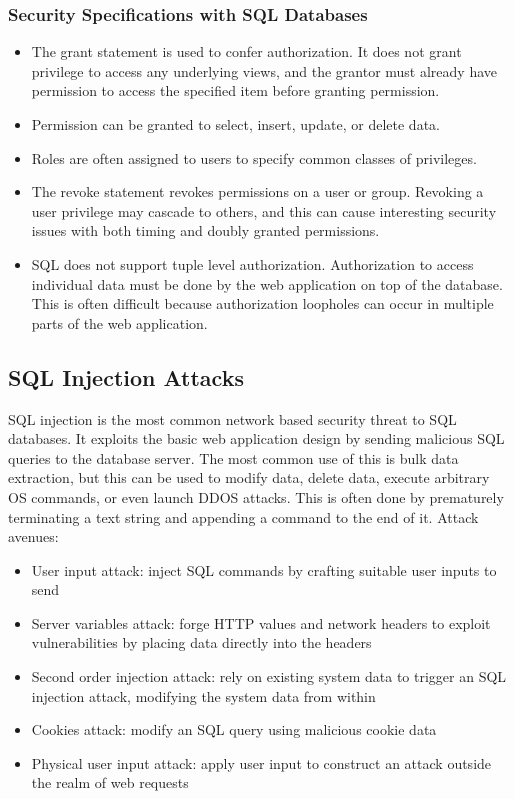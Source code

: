 \documentclass{math}
\begin{document}
\subsubsection*{Security Specifications with SQL Databases}
\begin{itemize}
  \item The grant statement is used to confer authorization. It does not grant
  privilege to access any underlying views, and the grantor must already have
  permission to access the specified item before granting permission.
  \item Permission can be granted to select, insert, update, or delete data.
  \item Roles are often assigned to users to specify common classes of
  privileges.
  \item The revoke statement revokes permissions on a user or group. Revoking
  a user privilege may cascade to others, and this can cause interesting
  security issues with both timing and doubly granted permissions.
  \item SQL does not support tuple level authorization. Authorization to access
  individual data must be done by the web application on top of the database.
  This is often difficult because authorization loopholes can occur in multiple
  parts of the web application.
\end{itemize}

\subsection*{SQL Injection Attacks}
SQL injection is the most common network based security threat to SQL databases.
It exploits the basic web application design by sending malicious SQL queries to
the database server. The most common use of this is bulk data extraction, but
this can be used to modify data, delete data, execute arbitrary OS commands, or
even launch DDOS attacks. This is often done by prematurely terminating a text
string and appending a command to the end of it. Attack avenues:
\begin{itemize}
  \item User input attack: inject SQL commands by crafting suitable user inputs
  to send
  \item Server variables attack: forge HTTP values and network headers to
  exploit vulnerabilities by placing data directly into the headers
  \item Second order injection attack: rely on existing system data to trigger
  an SQL injection attack, modifying the system data from within
  \item Cookies attack: modify an SQL query using malicious cookie data
  \item Physical user input attack: apply user input to construct an attack
  outside the realm of web requests
\end{itemize}
\end{document}
